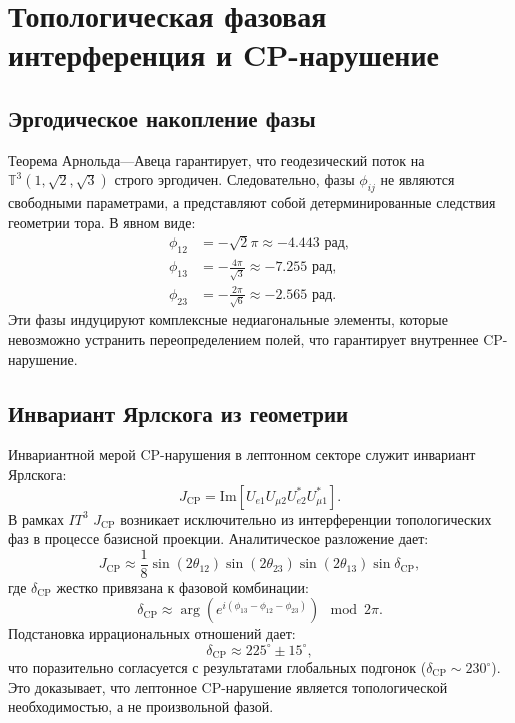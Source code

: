 \documentclass[12pt,a4paper]{article}
\begin{document}
\section{Топологическая фазовая интерференция и CP-нарушение}
\subsection{Эргодическое накопление фазы}
Теорема Арнольда—Авеца гарантирует, что геодезический поток на $\mathbb{T}^3(1,\sqrt{2},\sqrt{3})$ строго эргодичен. Следовательно, фазы $\phi_{ij}$ не являются свободными параметрами, а представляют собой детерминированные следствия геометрии тора. В явном виде:
\begin{align}
    \phi_{12} &= -\sqrt{2}\pi \approx -4.443 \text{ рад}, \\
    \phi_{13} &= -\frac{4\pi}{\sqrt{3}} \approx -7.255 \text{ рад}, \\
    \phi_{23} &= -\frac{2\pi}{\sqrt{6}} \approx -2.565 \text{ рад}.
\end{align}
Эти фазы индуцируют комплексные недиагональные элементы, которые невозможно устранить переопределением полей, что гарантирует внутреннее CP-нарушение.

\subsection{Инвариант Ярлскога из геометрии}
Инвариантной мерой CP-нарушения в лептонном секторе служит инвариант Ярлскога:
\begin{equation}
    J_{\text{CP}} = \text{Im}\left[ U_{e1} U_{\mu 2} U_{e2}^* U_{\mu 1}^* \right].
\end{equation}
В рамках $IT^3$ $J_{\text{CP}}$ возникает исключительно из интерференции топологических фаз в процессе базисной проекции. Аналитическое разложение дает:
\begin{equation}
    J_{\text{CP}} \approx \frac{1}{8} \sin(2\theta_{12}) \sin(2\theta_{23}) \sin(2\theta_{13}) \sin\delta_{\text{CP}},
\end{equation}
где $\delta_{\text{CP}}$ жестко привязана к фазовой комбинации:
\begin{equation}
    \delta_{\text{CP}} \approx \arg\left( e^{i(\phi_{13} - \phi_{12} - \phi_{23})} \right) \mod 2\pi.
\end{equation}
Подстановка иррациональных отношений дает:
\begin{equation}
    \delta_{\text{CP}} \approx 225^\circ \pm 15^\circ,
\end{equation}
что поразительно согласуется с результатами глобальных подгонок ($\delta_{\text{CP}} \sim 230^\circ$). Это доказывает, что лептонное CP-нарушение является топологической необходимостью, а не произвольной фазой.
\end{document}
